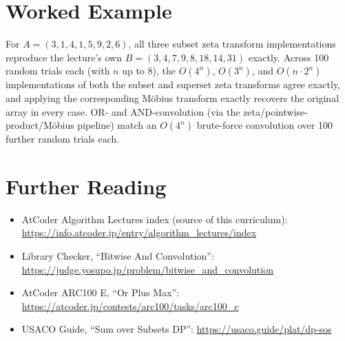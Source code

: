 \documentclass[11pt]{article}
\begin{document}
\section{Worked Example}
\begin{examplebox}
For $A=(3,1,4,1,5,9,2,6)$, all three subset zeta transform
implementations reproduce the lecture's own
$B=(3,4,7,9,8,18,14,31)$ exactly. Across 100 random trials each (with
$n$ up to $8$), the $O(4^n)$, $O(3^n)$, and $O(n\cdot 2^n)$
implementations of both the subset and superset zeta transforms agree
exactly, and applying the corresponding M\"obius transform exactly
recovers the original array in every case. OR- and AND-convolution
(via the zeta/pointwise-product/M\"obius pipeline) match an $O(4^n)$
brute-force convolution over 100 further random trials each.
\end{examplebox}

\section{Further Reading}
\begin{itemize}[leftmargin=1.5em]
  \item AtCoder Algorithm Lectures index (source of this curriculum):
        \url{https://info.atcoder.jp/entry/algorithm_lectures/index}
  \item Library Checker, ``Bitwise And Convolution'':
        \url{https://judge.yosupo.jp/problem/bitwise_and_convolution}
  \item AtCoder ARC100 E, ``Or Plus Max'':
        \url{https://atcoder.jp/contests/arc100/tasks/arc100_c}
  \item USACO Guide, ``Sum over Subsets DP'':
        \url{https://usaco.guide/plat/dp-sos}
\end{itemize}
\end{document}
